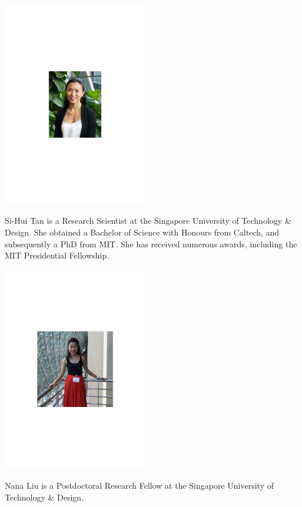 \begin{center}
\includegraphics[clip=true, width=0.475\textwidth]{photo_sihui_tan}
\end{center}

Si-Hui Tan is a Research Scientist at the Singapore University of Technology \& Design. She obtained a Bachelor of Science with Honours from Caltech, and subsequently a PhD from MIT. She has received numerous awards, including the MIT Presidential Fellowship.


%
%

\begin{center}
\includegraphics[clip=true, width=0.475\textwidth]{photo_nana_liu}
\end{center}

Nana Liu is a Postdoctoral Research Fellow at the Singapore University of Technology \& Design.


